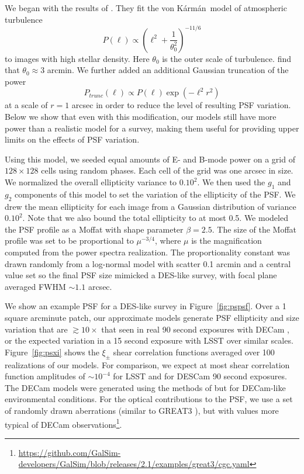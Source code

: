 \documentclass[iop, twocolappendix, appendixfloats, numberedappendix, apj]{hackemulateapj}
\newcommand{\vonkarman}{{von K\'arm\'an}~}
\begin{document}
We began with the results of \citet{heymans2012}. They fit the \vonkarman model
of atmospheric turbulence
\begin{displaymath}
  P(\ell) \propto \left(\ell^{2} + \frac{1}{\theta_{0}^2}\right)^{-11/6}
\end{displaymath}
to images with high stellar density. Here $\theta_{0}$ is the outer scale of
turbulence. \citep{heymans2012} find that $\theta_{0}\approx3$ arcmin.
We further added an additional Gaussian truncation of the power
\begin{displaymath}
  P_{trunc}(\ell) \propto P(\ell)\exp\left(-\ell^2r^{2}\right)
\end{displaymath}
at a scale of $r=1$ arcsec in order to reduce the level of resulting
PSF variation. Below we show that even with this modification, our models
still have more power than a realistic model for a survey, making them useful
for providing upper limits on the effects of PSF variation.

Using this model, we seeded equal amounts of E- and B-mode power on a grid of
$128\times128$ cells using random phases. Each cell of the grid was one
arcsec in size. We normalized the overall ellipticity variance to $0.10^2$. We then used
the $g_1$ and $g_2$ components of this model to set the variation of the ellipticity of
the PSF. We drew the mean ellipticity for each image from a Gaussian distribution of
variance $0.10^2$. Note that we also bound the total ellipticity to at most 0.5.
We modeled the PSF profile as a Moffat with shape parameter $\beta=2.5$.
The size of the Moffat profile was set to be proportional to $\mu^{-3/4}$,
where $\mu$ is the magnification computed from the power spectra realization. The
proportionality constant was drawn randomly from a log-normal model with
scatter 0.1 arcmin and a central value set so the final PSF size mimicked a DES-like
survey, with focal plane averaged FWHM $\sim1.1$ arcsec.

We show an example PSF for a DES-like survey in Figure~\ref{fig:pspsf}.  Over a
1 square arcminute patch, our approximate models generate PSF ellipticity and size
variation that are $\gtrsim10\times$ that seen in real 90 second exposures
with DECam \citep{DESY1shear}, or the expected variation in a 15 second exposure with
LSST \citep{jee2011} over similar scales. Figure~\ref{fig:psxi} shows the $\xi_{\pm}$ shear correlation
functions averaged over 100 realizations of our models. For comparison, we
expect at most shear correlation function amplitudes of $\sim10^{-4}$ for LSST
\citep{jee2011} and for DESCam 90 second exposures. The DECam models were generated
using the methods of \citet{jee2011} but for DECam-like environmental conditions. For
the optical contributions to the PSF, we use a set of randomly drawn
aberrations (similar to GREAT3 \citep{great3}), but with values more typical of
DECam observations\footnote{\url{https://github.com/GalSim-developers/GalSim/blob/releases/2.1/examples/great3/cgc.yaml}}.
\end{document}
